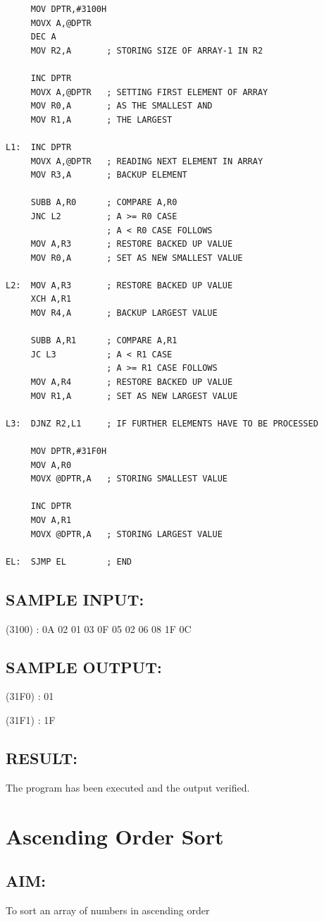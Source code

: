 \documentclass[a4paper,28pt]{report}
\begin{document}
\begin{lstlisting}
     MOV DPTR,#3100H
     MOVX A,@DPTR
     DEC A
     MOV R2,A       ; STORING SIZE OF ARRAY-1 IN R2
     
     INC DPTR
     MOVX A,@DPTR   ; SETTING FIRST ELEMENT OF ARRAY
     MOV R0,A       ; AS THE SMALLEST AND
     MOV R1,A       ; THE LARGEST
     
L1:  INC DPTR
     MOVX A,@DPTR   ; READING NEXT ELEMENT IN ARRAY
     MOV R3,A       ; BACKUP ELEMENT
     
     SUBB A,R0      ; COMPARE A,R0
     JNC L2         ; A >= R0 CASE
                    ; A < R0 CASE FOLLOWS
     MOV A,R3       ; RESTORE BACKED UP VALUE
     MOV R0,A       ; SET AS NEW SMALLEST VALUE
     
L2:  MOV A,R3       ; RESTORE BACKED UP VALUE
     XCH A,R1
     MOV R4,A       ; BACKUP LARGEST VALUE
     
     SUBB A,R1      ; COMPARE A,R1
     JC L3          ; A < R1 CASE
                    ; A >= R1 CASE FOLLOWS
     MOV A,R4       ; RESTORE BACKED UP VALUE
     MOV R1,A       ; SET AS NEW LARGEST VALUE
     
L3:  DJNZ R2,L1     ; IF FURTHER ELEMENTS HAVE TO BE PROCESSED

     MOV DPTR,#31F0H
     MOV A,R0
     MOVX @DPTR,A   ; STORING SMALLEST VALUE
     
     INC DPTR
     MOV A,R1
     MOVX @DPTR,A   ; STORING LARGEST VALUE
     
EL:  SJMP EL        ; END
\end{lstlisting}

\section*{SAMPLE INPUT:}
(3100) : 0A 02 01 03 0F 05 02 06 08 1F 0C
\section*{SAMPLE OUTPUT:}
(31F0) : 01

(31F1) : 1F
\section*{RESULT:}
The program has been executed and the output verified.
%
%
\chapter{Ascending Order Sort}
%
%
\section*{AIM:}
To sort an array of numbers in ascending order
\end{document}
